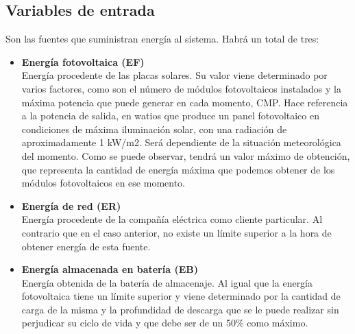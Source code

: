 \subsection{Variables de entrada}
Son las fuentes que suministran energía al sistema. Habrá un total de tres:
\begin{itemize}
	\item \textbf{Energía fotovoltaica (EF)}\\ Energía procedente de las placas solares. Su valor viene determinado por varios factores, como son el número de módulos fotovoltaicos instalados y la máxima potencia que puede generar en cada momento, \gls{CMP}. Hace referencia a la potencia de salida, en watios que produce un panel fotovoltaico en condiciones de máxima iluminación solar, con una radiación de aproximadamente 1 kW/m2. Será dependiente de la situación meteorológica del momento. Como se puede observar, tendrá un valor máximo de obtención, que representa la cantidad de energía máxima que podemos obtener de los módulos fotovoltaicos en ese momento.
	\item \textbf{Energía de red (ER)}\\ Energía procedente de la compañía eléctrica como cliente particular. Al contrario que en el caso anterior, no existe un límite superior a la hora de obtener energía de esta fuente.
	\item \textbf{Energía almacenada en batería (EB)}\\ Energía obtenida de la batería de almacenaje. Al igual que la energía fotovoltaica tiene un límite superior y viene determinado por la cantidad de carga de la misma y la profundidad de descarga que se le puede realizar sin perjudicar su ciclo de vida y que debe ser de un 50\% como máximo.
\end{itemize}
